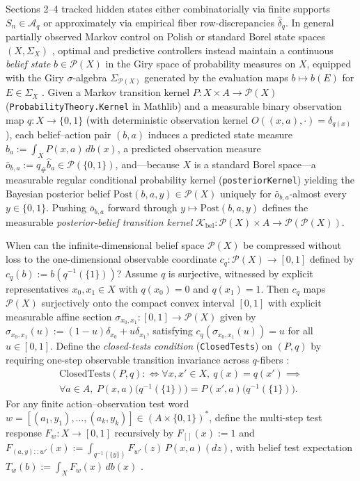 \documentclass[11pt,a4paper]{article}
\begin{document}
Sections 2--4 tracked hidden states either combinatorially via finite
supports \(S_n \in \mathcal{A}_q\) or approximately via empirical fiber
row-discrepancies \(\widehat{\delta}_q\). In general partially observed
Markov control on Polish or standard Borel state spaces
\((X, \Sigma_X)\)
\citep{bertsekasShreve1978, hernandezLerma1996, kallenberg2021}, optimal
and predictive controllers instead maintain a continuous \emph{belief
state} \(b \in \mathcal{P}(X)\) in the Giry space of probability
measures on \(X\), equipped with the Giry \(\sigma\)-algebra
\(\Sigma_{\mathcal{P}(X)}\) generated by the evaluation maps
\(b \mapsto b(E)\) for \(E \in \Sigma_X\) \citep{astrom1965, giry1982}.
Given a Markov transition kernel \(P: X \times A \to \mathcal{P}(X)\)
(\texttt{ProbabilityTheory.Kernel} in Mathlib) and a measurable binary
observation map \(q: X \to \{0,1\}\) (with deterministic observation
kernel \(O((x,a), \cdot) = \delta_{q(x)}\)), each belief--action pair
\((b,a)\) induces a predicted state measure
\(\widehat{b}_a := \int_X P(x,a)\, db(x)\), a predicted observation
measure
\(\bar{o}_{b,a} := q_\# \widehat{b}_a \in \mathcal{P}(\{0,1\})\),
and---because \(X\) is a standard Borel space---a measurable regular
conditional probability kernel (\texttt{posteriorKernel}) yielding the
Bayesian posterior belief \(\mathrm{Post}(b,a,y) \in \mathcal{P}(X)\)
uniquely for \(\bar{o}_{b,a}\)-almost every \(y \in \{0,1\}\). Pushing
\(\bar{o}_{b,a}\) forward through \(y \mapsto \mathrm{Post}(b,a,y)\)
defines the measurable \emph{posterior-belief transition kernel}
\(\mathcal{K}_{\mathrm{bel}}: \mathcal{P}(X) \times A \to \mathcal{P}(\mathcal{P}(X))\).

When can the infinite-dimensional belief space \(\mathcal{P}(X)\) be
compressed without loss to the one-dimensional observable coordinate
\(c_q: \mathcal{P}(X) \to [0,1]\) defined by
\(c_q(b) := b(q^{-1}(\{1\}))\)? Assume \(q\) is surjective, witnessed by
explicit representatives \(x_0, x_1 \in X\) with \(q(x_0) = 0\) and
\(q(x_1) = 1\). Then \(c_q\) maps \(\mathcal{P}(X)\) surjectively onto
the compact convex interval \([0,1]\) with explicit measurable affine
section \(\sigma_{x_0, x_1}: [0,1] \to \mathcal{P}(X)\) given by
\(\sigma_{x_0, x_1}(u) := (1 - u)\delta_{x_0} + u \delta_{x_1}\),
satisfying \(c_q(\sigma_{x_0, x_1}(u)) = u\) for all \(u \in [0,1]\).
Define the \emph{closed-tests condition} (\texttt{ClosedTests}) on
\((P, q)\) by requiring one-step observable transition invariance across
\(q\)-fibers
\citep{burkeRosenblatt1958, kemenySnell1960, paigeTarjan1987, larsenSkou1991, givanDeanGreig2003}:
\[\begin{aligned}
\mathrm{ClosedTests}(P, q) :\iff \forall x, x' \in X,\ q(x) = q(x') \implies \\
\forall a \in A,\ P(x,a)\bigl(q^{-1}(\{1\})\bigr) = P(x',a)\bigl(q^{-1}(\{1\})\bigr).
\end{aligned}\] For any finite action--observation test word
\(w = [(a_1, y_1), \dots, (a_k, y_k)] \in (A \times \{0,1\})^*\), define
the multi-step test response \(F_w: X \to [0,1]\) recursively by
\(F_{[]}(x) := 1\) and
\(F_{(a,y)::w'}(x) := \int_{q^{-1}(\{y\})} F_{w'}(z)\, P(x,a)(dz)\),
with belief test expectation \(T_w(b) := \int_X F_w(x)\, db(x)\)
\citep{jaeger2000, littmanSuttonSingh2001}.
\end{document}
